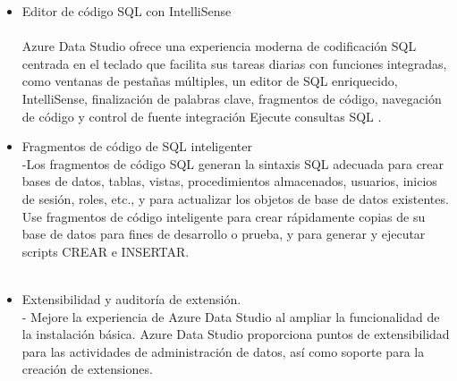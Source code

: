 \begin {itemize}
	\item Editor de código SQL con IntelliSense\\\\
	\subitem Azure Data Studio ofrece una experiencia moderna de codificación SQL centrada en el teclado que facilita sus tareas diarias con funciones integradas, como ventanas de pestañas múltiples, un editor de SQL enriquecido, IntelliSense, finalización de palabras clave, fragmentos de código, navegación de código y control de fuente integración Ejecute consultas SQL .
	\item Fragmentos de código de SQL inteligenter\\
	\subitem -Los fragmentos de código SQL generan la sintaxis SQL adecuada para crear bases de datos, tablas, vistas, procedimientos almacenados, usuarios, inicios de sesión, roles, etc., y para actualizar los objetos de base de datos existentes. Use fragmentos de código inteligente para crear rápidamente copias de su base de datos para fines de desarrollo o prueba, y para generar y ejecutar scripts CREAR e INSERTAR.\\\\
	
	\item Extensibilidad y auditoría de extensión.\\
	\subitem - Mejore la experiencia de Azure Data Studio al ampliar la funcionalidad de la instalación básica. Azure Data Studio proporciona puntos de extensibilidad para las actividades de administración de datos, así como soporte para la creación de extensiones.\\
	
\end{itemize}





